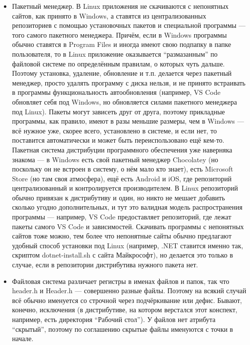 \documentclass{../../text-style}
\begin{document}
\begin{itemize}
    \item Пакетный менеджер.
        В Linux приложения не скачиваются с непонятных сайтов, как принято в Windows, а ставятся из централизованных репозиториев с помощью установочных пакетов и специальной программы --- того самого пакетного менеджера.
        Причём, если в Windows программы обычно ставятся в Program Files и иногда имеют свою подпапку в папке пользователя, то в Linux приложение оказывается \enquote{размазанным} по файловой системе по определённым правилам, о которых чуть дальше.
        Поэтому установка, удаление, обновление и т.п. делается через пакетный менеджер, просто удалять программу с диска нельзя, и не принято встраивать в программы функциональность автообновления (например, VS Code обновляет себя под Windows, но обновляется силами пакетного менеджера под Linux).
        Пакеты могут зависеть друг от друга, поэтому прикладные программы, как правило, имеют в разы меньшие размеры, чем в Windows --- всё нужное уже, скорее всего, установлено в системе, и если нет, то поставится автоматически и может быть переиспользовано ещё кем-то.
        Пакетная система дистрибуции программного обеспечения уже наверняка знакома --- в Windows есть свой пакетный менеджер Chocolatey (но поскольку он не встроен в систему, о нём мало кто знает), есть Microsoft Store (но там своя атмосфера), ещё есть Android и iOS, где репозиторий централизованный и контролируется производителем.
        В Linux репозиторий обычно привязан к дистрибутиву и один, но никто не мешает добавить сколько угодно дополнительных, и тут это валидная модель распространения программы --- например, VS Code предоставляет репозиторий, где лежат пакеты самого VS Code и зависимостей.
        Скачивать программы с непонятных сайтов тоже можно, тем более что непонятные сайты обычно предлагают удобный способ установки под Linux (например, .NET ставится именно так, скриптом dotnet-install.sh с сайта Майкрософт), но делается это только в случае, если в репозитории дистрибутива нужного пакета нет.
    \item Файловая система различает регистры в именах файлов и папок, так что header.h и Header.h --- совершенно разные файлы.
        Поэтому на всякий случай всё обычно именуется со строчной через подчёркивание или дефис.
        Бывают, конечно, исключения (в дистрибутиве, на котором верстался этот конспект, например, есть директория \enquote{Рабочий стол}).
        У файлов нет атрибута \enquote{скрытый}, поэтому по соглашению скрытые файлы именуются с точки в начале.

\end{itemize}
\end{document}
